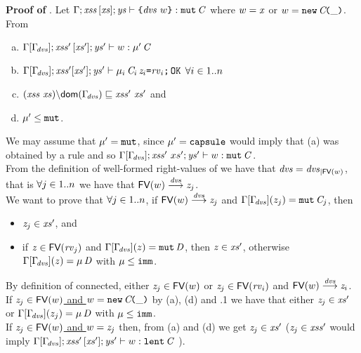 \medskip
\noindent
{\bf Proof of }. Let  $\Gamma;\mathit{xss}\,[\mathit{xs}];\mathit{ys}\vdash \texttt{\{}\mathit{dvs}\ w\texttt{\}}:\texttt{mut}\,\mathit{C}$ where $w=\mathit{x}$ or $w=\texttt{new}\,\mathit{C}\!\texttt{(}\_\texttt{)}$. From 
\begin{enumerate}[(a)]
\item  ${\Gamma[\Gamma_{\!\mathit{dvs}}]};{\mathit{xss}'}\,[\mathit{xs}'];\mathit{ys}'\vdash w:\mu'\,\mathit{C}$ 
\item $\Gamma[\Gamma_{\!\mathit{dvs}}];\mathit{xss}'[\mathit{xs}'];\mathit{ys}'\vdash \mu_i\,\mathit{C}_i\,\mathit{z}_i\texttt{=}\mathit{rv}_i\texttt{;}\,{\tt OK}$  $\forall i\in1..n$
\item $\LessEq{(\LentLocked\ \xs){\setminus}\dom{\TypeEnv{\dvs}}}{\LentLocked'\ \xs'}$ and
\item $\mu'\leq\texttt{mut}$.
\end{enumerate}
We may assume that $\mu'=\texttt{mut}$, since $\mu'=\texttt{capsule}$ would imply that (a) was obtained by a  rule and so $\TypeCheck{{\SubstFun{\Gamma}{\TypeEnv{\dvs}}}}{{\LentLocked'\ xs'}}{\StronglyLocked'}{\cOrx}{\Type{\mutable}{\C}}$.\\
From the definition of well-formed right-values of 
 we have that $\mathit{dvs}=\mathit{dvs}_{|\textsf{FV}(w)}$, that is $\forall j\in1..n$ we have that $\textsf{FV}(w)\stackrel{\mathit{dvs}}{\longrightarrow}\mathit{z}_j$.\\
We want to prove that $\forall j\in1..n$, if $\textsf{FV}(w)\stackrel{\mathit{dvs}}{\longrightarrow}\mathit{z}_j$ and 
$\Gamma[\Gamma_{\!\mathit{dvs}}](z_j)=\texttt{mut}\,\mathit{C}_j$, then 
\begin{itemize}
\item $\mathit{z}_j\in\mathit{xs}'$, and
\item if $\mathit{z}\in\textsf{FV}(\mathit{rv}_j)$ and $\Gamma[\Gamma_{\!\mathit{dvs}}](z)=\texttt{mut}\,\mathit{D}$, then $\mathit{z}\in\mathit{xs}'$, otherwise 
 $\Gamma[\Gamma_{\!\mathit{dvs}}](z)=\mu\,\mathit{D}$ with $\mu\leq\texttt{imm}$.
\end{itemize}
By definition of connected, either $\mathit{z}_j\in\textsf{FV}(w)$ or 
 $\mathit{z}_j\in\textsf{FV}(\mathit{rv}_i)$ and $\textsf{FV}(w)\stackrel{\mathit{dvs}}{\longrightarrow}\mathit{z}_i$.\\
If \underline{$\mathit{z}_j\in\textsf{FV}(w)$ and $w=\texttt{new}\,\mathit{C}\!\texttt{(}\_\texttt{)}$} by (a), (d) and .1 we have that either $\mathit{z}_j\in\mathit{xs}'$
or $\Gamma[\Gamma_{\!\mathit{dvs}}](z_j)=\mu\,\mathit{D}$ with $\mu\leq\texttt{imm}$. \\
If \underline{$\mathit{z}_j\in\textsf{FV}(w)$ and $w=\mathit{z}_j$} then, from (a) and (d) we get $\mathit{z}_j\in\mathit{xs}'$ ($\mathit{z}_j\in\mathit{xss}'$ would
imply ${\Gamma[\Gamma_{\!\mathit{dvs}}]};{\mathit{xss}'}\,[\mathit{xs}'];\mathit{ys}'\vdash w:\texttt{lent}\,\mathit{C}$ ). \\

